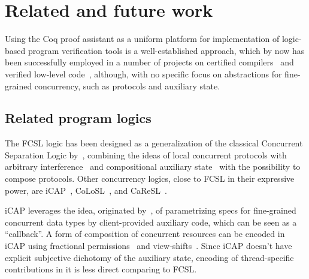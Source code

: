 
\section{Related and future work}
\label{sec:related-work}

Using the Coq proof assistant as a uniform platform for implementation
of logic-based program verification tools is a well-established
approach, which by now has been successfully employed in a number of
projects on certified compilers~\cite{Leroy:POPL06,Appel-al:BOOK14}
and verified low-level
code~\cite{Shao:CACM10,Chlipala:PLDI11,Jensen-al:POPL13}, although,
with no specific focus on abstractions for fine-grained concurrency,
such as protocols and auxiliary state.
%


\subsection{Related program logics}
\label{sec:relat-logic-fram}

The FCSL logic has been designed as a generalization of the classical
Concurrent Separation Logic by~\citet{OHearn:TCS07}, combining the
ideas of local concurrent protocols with arbitrary
interference~\cite{Jones:TOPLAS83,Feng:POPL09} and compositional
auxiliary state~\cite{LeyWild-Nanevski:POPL13} with the possibility to
compose protocols.
%
%
Other concurrency logics, close to FCSL in their expressive power, are
iCAP~\cite{Svendsen-Birkedal:ESOP14}, CoLoSL~\cite{Raad-al:colosl},
and CaReSL~\cite{Turon-al:ICFP13}.
 
iCAP leverages the idea, originated by~\citet{Jacobs-Piessens:POPL11},
of parametrizing specs for fine-grained concurrent data types by
client-provided auxiliary code, which can be seen as a ``callback''. A
form of composition of concurrent resources can be encoded in iCAP
using fractional permissions~\cite{Bornat-al:POPL05} and
view-shifts~\cite{DinsdaleYoung-al:POPL13}.
%
Since iCAP doesn't have explicit subjective dichotomy of the auxiliary
state, encoding of thread-specific contributions in it is less direct
comparing to FCSL.


